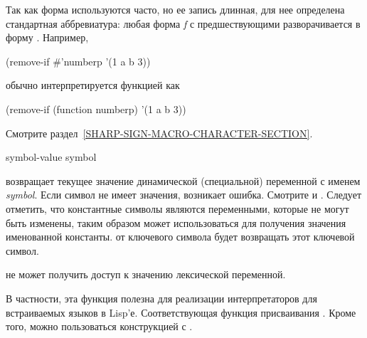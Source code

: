 \begin{defspec}
Так как форма  используются часто, но ее запись длинная,
для нее определена стандартная аббревиатура: любая форма \emph{f} с
предшествующими  разворачивается в форму .
Например,
\begin{lisp}
(remove-if \#'numberp '(1 a b 3))
\end{lisp}
обычно интерпретируется функцией  как
\begin{lisp}
(remove-if (function numberp) '(1 a b 3))
\end{lisp}
Смотрите раздел~\ref{SHARP-SIGN-MACRO-CHARACTER-SECTION}.
\end{defspec}

\begin{defun}[Function]
symbol-value symbol

 возвращает текущее значение динамической (специальной)
переменной с именем \emph{symbol}.
Если символ не имеет значения, возникает ошибка. Смотрите  и
. 
Следует отметить, что константные символы являются переменными, которые не могут
быть изменены, таким образом  может использоваться для
получения значения именованной константы.  от ключевого
символа будет возвращать этот ключевой символ.

 не может получить доступ к значению лексической переменной.

В частности, эта функция полезна для реализации интерпретаторов для встраиваемых
языков в Lisp'е.
Соответствующая функция присваивания . Кроме того, можно пользоваться
конструкцией  с .
\end{defun}

